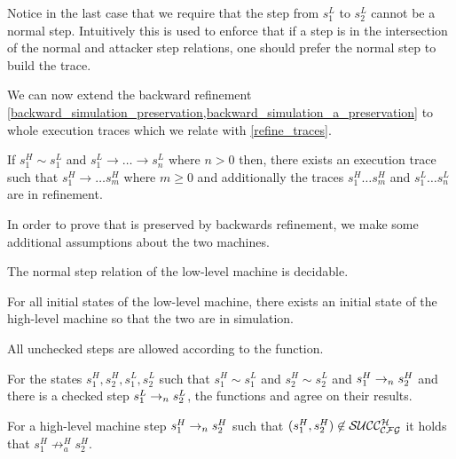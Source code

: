 Notice in the last case that we require that the step from $s^L_1$ to
$s^L_2$ cannot be a normal step. Intuitively this is used to enforce
that if a step is in the intersection of the normal and attacker step
relations, one should prefer the normal step to build the trace.

We can now extend the backward refinement
\cref{backward_simulation_preservation,backward_simulation_a_preservation}
to whole execution traces which we relate with \cref{refine_traces}.

\begin{theorem}
  \label{backward_refinement_traces}
  If $s^H_1 \sim s^L_1$ and $s^L_1 \to \ldots \to s^L_n$ where $n > 0$ then,
  there exists an execution trace such that $s^H_1 \to \ldots s^H_m$ where
  $m \geq 0$ and additionally the traces $s^H_1 \ldots s^H_m$ and
  $s^L_1 \ldots s^L_n$ are in refinement.
\end{theorem}

In order to prove that \CFI is preserved by backwards refinement, we
make some additional assumptions about the two machines.

\begin{definition}
\label{step_classic}
The normal step relation of the low-level machine is decidable.
\end{definition}

\begin{definition}
\label{initial_refine}
For all initial states of the low-level machine, there exists an
initial state of the high-level machine so that the two are in
simulation.
\end{definition}

\begin{definition}
\label{cfg_nocheck}
All unchecked steps are allowed according to the \SUCC{} function.
\end{definition}

\begin{definition}
\label{cfg_equiv}
For the states $s^{H}_1, s^{H}_2, s^L_1, s^{L}_2$ such that $s^{H}_1
\sim s^{L}_1$ and $s^H_2 \sim s^L_2$ and $s^{H}_1\to_ns^H_2$ and
there is a checked step $s^{L}_1\to_ns^L_2$, the functions
 and  agree on their results.
\end{definition}

\begin{definition}
\label{av_no_attacker}
For a high-level machine step $s^H_1\to_ns^H_2$ such that
$(s^H_1,s^H_2) \not \in \mathcal{SUCC_\mathcal{CFG}^{H}}$ it holds that $s^H_1 \not \to^H_a
s^H_2$.
\end{definition}

